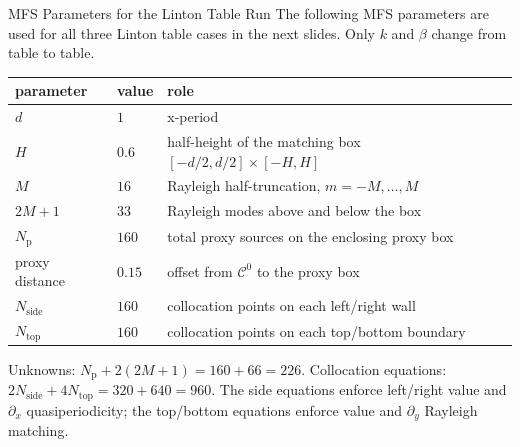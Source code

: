 \documentclass[aspectratio=169]{beamer}
\newcommand{\Czero}{\mathcal C^0}
\begin{document}
\begin{frame}{MFS Parameters for the Linton Table Run}
  \scriptsize
  The following MFS parameters are used for all three Linton table cases in
  the next slides.  Only \(k\) and \(\beta\) change from table to table.

  \vspace{0.1em}
  \begin{center}
  \renewcommand{\arraystretch}{1.04}
  \begin{tabular}{lll}
    \hline
    parameter & value & role\\
    \hline
    \(d\) & \(1\) & x-period\\
    \(H\) & \(0.6\) & half-height of the matching box \( [-d/2,d/2]\times[-H,H]\)\\
    \(M\) & \(16\) & Rayleigh half-truncation, \(m=-M,\ldots,M\)\\
    \(2M+1\) & \(33\) & Rayleigh modes above and below the box\\
    \(N_{\mathrm p}\) & \(160\) & total proxy sources on the enclosing proxy box\\
    proxy distance & \(0.15\) & offset from \(\Czero\) to the proxy box\\
    \(N_{\mathrm{side}}\) & \(160\) & collocation points on each left/right wall\\
    \(N_{\mathrm{top}}\) & \(160\) & collocation points on each top/bottom boundary\\
    \hline
  \end{tabular}
  \end{center}

  \vspace{0.1em}
  Unknowns:
  \(N_{\mathrm p}+2(2M+1)=160+66=226\).
  Collocation equations:
  \(2N_{\mathrm{side}}+4N_{\mathrm{top}}=320+640=960\).
  The side equations enforce left/right value and \(\partial_x\)
  quasiperiodicity; the top/bottom equations enforce value and
  \(\partial_y\) Rayleigh matching.
\end{frame}
\end{document}
